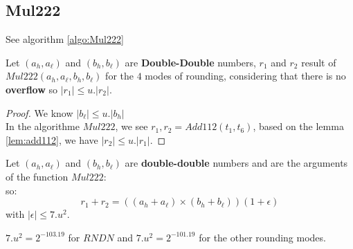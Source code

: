 \subsection{Mul222}
See algorithm \ref{algo:Mul222}
\begin{lem}[Mul222] Let $(a_h,a_{\ell})$  and $(b_h,b_{\ell})$ are  \textbf{Double-Double} numbers, $r_1$ and $r_2$ result of $Mul222(a_h,a_{\ell},b_h,b_{\ell})$ for the $4$ modes of rounding, considering that there is no \textbf{overflow} so $ \lvert r_1 \rvert \le u.\lvert r_2 \rvert $.
\end{lem}

\begin{proof} \color{-yellow}
We know $\lvert b_{\ell} \rvert \le u.\lvert b_h \rvert$\\
In the algorithme $Mul222$, we see $r_1, r_2 = Add112(t_1, t_6)$, based on the lemma \ref{lem:add112}, we have $\lvert r_2 \rvert \le u.\lvert r_1 \rvert$.
\end{proof}

\begin{theo}
Let $(a_h,a_{\ell})$  and $(b_h,b_{\ell})$ are \textbf{double-double} numbers and are the arguments of the function $Mul222$:\\
so:\\
$$r_1+r_2 = ((a_h+a_{\ell}) \times (b_h+b_{\ell}))(1+\epsilon)$$ with $\lvert \epsilon \rvert \le 7.u^2$.
\end{theo}

$7.u^2 = 2^{-103.19}$ for $RNDN$ and $7.u^2 = 2^{-101.19}$ for the other rounding modes.

